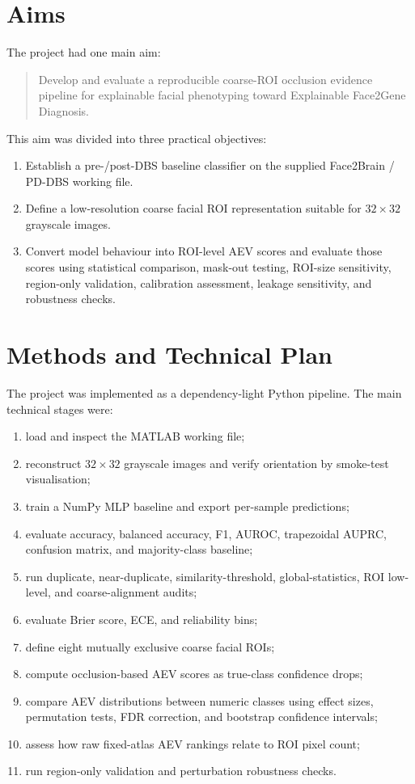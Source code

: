 \documentclass[oneside,12pt]{article}
\begin{document}
\section*{Aims}

The project had one main aim:

\begin{quote}
Develop and evaluate a reproducible coarse-ROI occlusion evidence pipeline for explainable facial phenotyping toward Explainable Face2Gene Diagnosis.
\end{quote}

This aim was divided into three practical objectives:

\begin{enumerate}
\item Establish a pre-/post-DBS baseline classifier on the supplied Face2Brain / PD-DBS working file.
\item Define a low-resolution coarse facial ROI representation suitable for $32\times32$ grayscale images.
\item Convert model behaviour into ROI-level AEV scores and evaluate those scores using statistical comparison, mask-out testing, ROI-size sensitivity, region-only validation, calibration assessment, leakage sensitivity, and robustness checks.
\end{enumerate}

\section*{Methods and Technical Plan}

The project was implemented as a dependency-light Python pipeline. The main technical stages were:

\begin{enumerate}
\item load and inspect the MATLAB working file;
\item reconstruct $32\times32$ grayscale images and verify orientation by smoke-test visualisation;
\item train a NumPy MLP baseline and export per-sample predictions;
\item evaluate accuracy, balanced accuracy, F1, AUROC, trapezoidal AUPRC, confusion matrix, and majority-class baseline;
\item run duplicate, near-duplicate, similarity-threshold, global-statistics, ROI low-level, and coarse-alignment audits;
\item evaluate Brier score, ECE, and reliability bins;
\item define eight mutually exclusive coarse facial ROIs;
\item compute occlusion-based AEV scores as true-class confidence drops;
\item compare AEV distributions between numeric classes using effect sizes, permutation tests, FDR correction, and bootstrap confidence intervals;
\item assess how raw fixed-atlas AEV rankings relate to ROI pixel count;
\item run region-only validation and perturbation robustness checks.
\end{enumerate}
\end{document}
